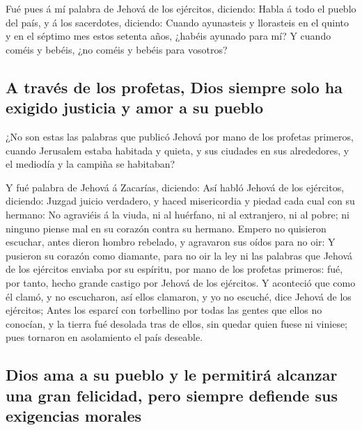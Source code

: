  Fué pues á mí palabra de Jehová de los ejércitos, diciendo:
 Habla á todo el pueblo del país, y á los sacerdotes,
diciendo: Cuando ayunasteis y llorasteis en el quinto y en el séptimo
mes estos setenta años, ¿habéis ayunado para mí?  Y cuando
coméis y bebéis, ¿no coméis y bebéis para vosotros?

\hypertarget{a-travuxe9s-de-los-profetas-dios-siempre-solo-ha-exigido-justicia-y-amor-a-su-pueblo}{%
\subsection{A través de los profetas, Dios siempre solo ha exigido
justicia y amor a su
pueblo}\label{a-travuxe9s-de-los-profetas-dios-siempre-solo-ha-exigido-justicia-y-amor-a-su-pueblo}}

 ¿No son estas las palabras que publicó Jehová por mano de
los profetas primeros, cuando Jerusalem estaba habitada y quieta, y sus
ciudades en sus alrededores, y el mediodía y la campiña se habitaban?

 Y fué palabra de Jehová á Zacarías, diciendo: 
Así habló Jehová de los ejércitos, diciendo: Juzgad juicio verdadero, y
haced misericordia y piedad cada cual con su hermano:  No
agraviéis á la viuda, ni al huérfano, ni al extranjero, ni al pobre; ni
ninguno piense mal en su corazón contra su hermano.  Empero
no quisieron escuchar, antes dieron hombro rebelado, y agravaron sus
oídos para no oir:  Y pusieron su corazón como diamante,
para no oir la ley ni las palabras que Jehová de los ejércitos enviaba
por su espíritu, por mano de los profetas primeros: fué, por tanto,
hecho grande castigo por Jehová de los ejércitos.  Y
aconteció que como él clamó, y no escucharon, así ellos clamaron, y yo
no escuché, dice Jehová de los ejércitos;  Antes los
esparcí con torbellino por todas las gentes que ellos no conocían, y la
tierra fué desolada tras de ellos, sin quedar quien fuese ni viniese;
pues tornaron en asolamiento el país deseable.

\hypertarget{dios-ama-a-su-pueblo-y-le-permitiruxe1-alcanzar-una-gran-felicidad-pero-siempre-defiende-sus-exigencias-morales}{%
\subsection{Dios ama a su pueblo y le permitirá alcanzar una gran
felicidad, pero siempre defiende sus exigencias
morales}\label{dios-ama-a-su-pueblo-y-le-permitiruxe1-alcanzar-una-gran-felicidad-pero-siempre-defiende-sus-exigencias-morales}}

